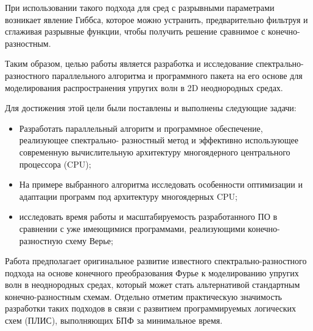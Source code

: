 При использовании такого подхода для сред с разрывными параметрами возникает явление Гиббса,
которое можно устранить, предварительно фильтруя и сглаживая разрывные функции,
чтобы получить решение сравнимое с конечно-разностным.

Таким образом, целью работы является разработка  и исследование спектрально-разностного
параллельного алгоритма и программного пакета на его основе для моделирования распространения
упругих волн в 2D неоднородных средах.

Для достижения этой цели были поставлены и выполнены следующие задачи:
\begin{itemize}
    \item Разработать параллельный алгоритм и программное обеспечение, реализующее спектрально-
разностный метод и эффективно использующее современную вычислительную
архитектуру многоядерного центрального процессора (CPU);
    \item На примере выбранного алгоритма исследовать особенности оптимизации и адаптации программ под архитектуру многоядерных CPU;
    \item исследовать время работы и масштабируемость разработанного ПО в
сравнении с уже имеющимися программами, реализующими конечно-разностную схему
Верье;
\end{itemize}

Работа предполагает оригинальное развитие известного спектрально-разностного подхода
на основе конечного преобразования Фурье к моделированию упругих волн в
неоднородных средах, который может стать альтернативой стандартным конечно-разностным схемам.
Отдельно отметим практическую значимость разработки таких подходов в связи с развитием
программируемых логических схем (ПЛИС), выполняющих БПФ за минимальное время.

\clearpage
